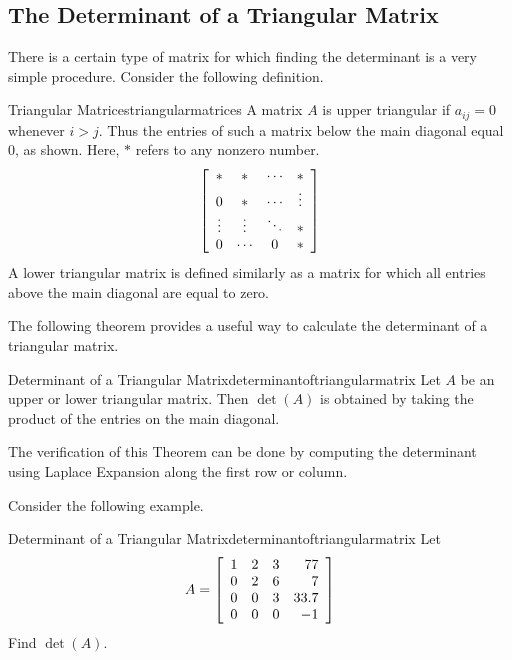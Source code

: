\subsection{The Determinant of a Triangular Matrix}

There is a certain type of matrix for which finding the determinant is
a very simple procedure. 
Consider the following definition. 

\begin{definition}{Triangular Matrices}{triangularmatrices}
A matrix $A$ is upper triangular
 if $a_{ij}=0$ whenever $i>j$. Thus the entries of such a
matrix below the main diagonal equal $0$, 
as shown. Here, $\ast$ refers to any nonzero number. 
\begin{equation*}
\left[
\begin{array}{cccc}
\ast & \ast & \cdots & \ast \\
0 & \ast & \cdots & \vdots \\
\vdots & \vdots & \ddots & \ast \\
0 & \cdots & 0 & \ast
\end{array}
\right]
\end{equation*}
A lower triangular matrix is defined similarly as a matrix for which all
entries above the
main diagonal are equal to zero.
\end{definition}

The following theorem provides a useful way to calculate the determinant
of a triangular matrix. 

\begin{theorem}{Determinant of a Triangular Matrix}{determinantoftriangularmatrix}
Let $A$ be an upper or lower triangular matrix. Then $\det \left( A\right) $
is obtained by taking the product of the entries on the main diagonal.
\end{theorem}

The verification of this Theorem can be done by computing the
determinant using Laplace Expansion along the first row or column. 

Consider the following example. 

\begin{example}{Determinant of a Triangular Matrix}{determinantoftriangularmatrix}
Let
\begin{equation*}
A=\left[
\begin{array}{rrrr}
1 & 2 & 3 & 77 \\
0 & 2 & 6 & 7 \\
0 & 0 & 3 & 33.7 \\
0 & 0 & 0 & -1
\end{array}
\right]
\end{equation*}
Find $\det \left( A\right) .$
\end{example}

